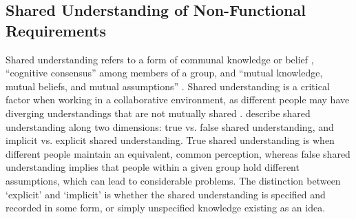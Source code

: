 \documentclass[smallextended]{svjour3}
\begin{document}
\subsection{Shared Understanding of Non-Functional Requirements}
Shared understanding refers to a form of communal knowledge or belief \citep{glinz_shared_2015}, 
 ``cognitive consensus''
\citep{kleinsmann2010understanding} among members of a group, and ``mutual knowledge, mutual beliefs, and mutual assumptions'' \citep{clark1991grounding}.
Shared understanding is a critical factor when working in a collaborative environment, 
as different people may have diverging understandings that are not mutually shared \citep{bittner2014creating}.
\cite{glinz_shared_2015} describe shared understanding along two dimensions: true vs. false shared understanding, and implicit vs. explicit shared understanding. 
True shared understanding is when different people maintain an equivalent, common perception, whereas false shared understanding implies that people within a given group hold different assumptions, which can lead to considerable problems. 
The distinction between `explicit' and `implicit' is whether the shared understanding is specified and recorded in some form, or simply unspecified knowledge existing as an idea.
\end{document}
